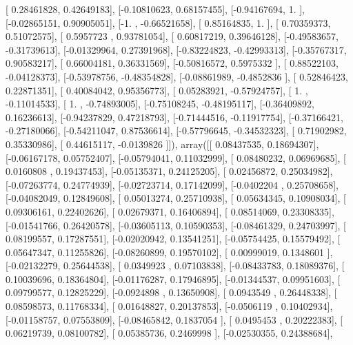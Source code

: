 \documentclass{article}
\begin{document}
       [ 0.28461828,  0.42649183],
       [-0.10810623,  0.68157455],
       [-0.94167694,  1.        ],
       [-0.02865151,  0.90905051],
       [-1.        , -0.66521658],
       [ 0.85164835,  1.        ],
       [ 0.70359373,  0.51072575],
       [ 0.5957723 ,  0.93781054],
       [ 0.60817219,  0.39646128],
       [-0.49583657, -0.31739613],
       [-0.01329964,  0.27391968],
       [-0.83224823, -0.42993313],
       [-0.35767317,  0.90583217],
       [ 0.66004181,  0.36331569],
       [-0.50816572,  0.5975332 ],
       [ 0.88522103, -0.04128373],
       [-0.53978756, -0.48354828],
       [-0.08861989, -0.4852836 ],
       [ 0.52846423,  0.22871351],
       [ 0.40084042,  0.95356773],
       [ 0.05283921, -0.57924757],
       [ 1.        , -0.11014533],
       [ 1.        , -0.74893005],
       [-0.75108245, -0.48195117],
       [-0.36409892,  0.16236613],
       [-0.94237829,  0.47218793],
       [-0.71444516, -0.11917754],
       [-0.37166421, -0.27180066],
       [-0.54211047,  0.87536614],
       [-0.57796645, -0.34532323],
       [ 0.71902982,  0.35330986],
       [ 0.44615117, -0.0139826 ]]), array([[ 0.08437535,  0.18694307],
       [-0.06167178,  0.05752407],
       [-0.05794041,  0.11032999],
       [ 0.08480232,  0.06969685],
       [ 0.0160808 ,  0.19437453],
       [-0.05135371,  0.24125205],
       [ 0.02456872,  0.25034982],
       [-0.07263774,  0.24774939],
       [-0.02723714,  0.17142099],
       [-0.0402204 ,  0.25708658],
       [-0.04082049,  0.12849608],
       [ 0.05013274,  0.25710938],
       [ 0.05634345,  0.10908034],
       [ 0.09306161,  0.22402626],
       [ 0.02679371,  0.16406894],
       [ 0.08514069,  0.23308335],
       [-0.01541766,  0.26420578],
       [-0.03605113,  0.10590353],
       [-0.08461329,  0.24703997],
       [ 0.08199557,  0.17287551],
       [-0.02020942,  0.13541251],
       [-0.05754425,  0.15579492],
       [ 0.05647347,  0.11255826],
       [-0.08260899,  0.19570102],
       [ 0.00999019,  0.1348601 ],
       [-0.02132279,  0.25644538],
       [ 0.0349923 ,  0.07103838],
       [-0.08433783,  0.18089376],
       [ 0.10039696,  0.18364804],
       [-0.01176287,  0.17946895],
       [-0.01344537,  0.09951603],
       [ 0.09799577,  0.12825229],
       [-0.0924898 ,  0.13650908],
       [ 0.0943549 ,  0.26448338],
       [ 0.08598573,  0.11768334],
       [ 0.01648827,  0.20137853],
       [-0.0506119 ,  0.10402934],
       [-0.01158757,  0.07553809],
       [-0.08465842,  0.1837054 ],
       [ 0.0495453 ,  0.20222383],
       [ 0.06219739,  0.08100782],
       [ 0.05385736,  0.2469998 ],
       [-0.02530355,  0.24388684],
\end{document}
